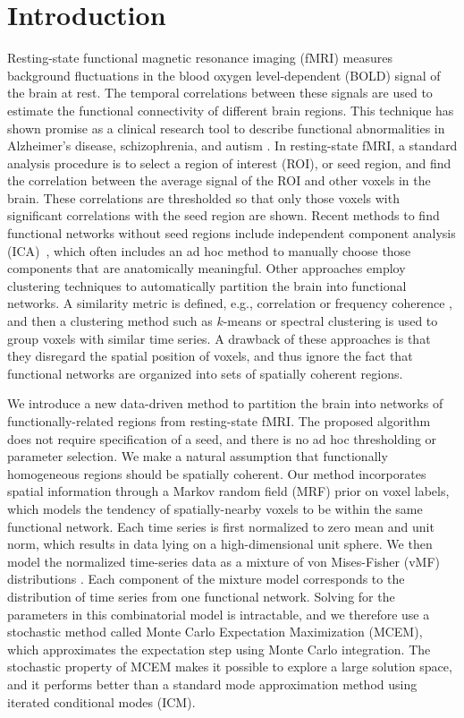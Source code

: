 \documentclass[runningheads, a4paper]{llncs}
\begin{document}
\section{Introduction}
Resting-state functional magnetic resonance imaging (fMRI) measures background
fluctuations in the blood oxygen level-dependent (BOLD) signal of the brain at
rest. The temporal correlations between these signals are used to estimate the
functional connectivity of different brain regions. This technique has shown
promise as a clinical research tool to describe functional abnormalities in
Alzheimer's disease, schizophrenia, and autism \cite{fox2010clinical}. In
resting-state fMRI, a standard analysis procedure is to select a region of
interest (ROI), or seed region, and find the correlation between the average
signal of the ROI and other voxels in the brain. These correlations are
thresholded so that only those voxels with significant correlations with the
seed region are shown. Recent methods to find functional networks without seed
regions include independent component analysis
(ICA)~\cite{beckmann2005tensorial}, which often includes an ad hoc method to
manually choose those components that are anatomically meaningful. Other
approaches employ clustering techniques to automatically partition the brain
into functional networks. A similarity metric is defined, e.g., correlation
\cite{5074650} or frequency coherence \cite{thirion2006detection}, and then a
clustering method such as $k$-means or spectral clustering is used to group
voxels with similar time series. A drawback of these approaches is that they
disregard the spatial position of voxels, and thus ignore the fact that
functional networks are organized into sets of spatially coherent regions.

We introduce a new data-driven method to partition the brain into networks of
functionally-related regions from resting-state fMRI. The proposed algorithm
does not require specification of a seed, and there is no ad hoc thresholding or
parameter selection. We make a natural assumption that functionally homogeneous
regions should be spatially coherent. Our method incorporates spatial
information through a Markov random field (MRF) prior on voxel labels, which
models the tendency of spatially-nearby voxels to be within the same functional
network. Each time series is first normalized to zero mean and unit norm, which
results in data lying on a high-dimensional unit sphere. We then model the
normalized time-series data as a mixture of von Mises-Fisher (vMF) distributions
\cite{banerjee2006clustering}. Each component of the mixture model corresponds
to the distribution of time series from one functional network. Solving for the
parameters in this combinatorial model is intractable, and we therefore use a
stochastic method called Monte Carlo Expectation Maximization (MCEM), which
approximates the expectation step using Monte Carlo integration. The stochastic
property of MCEM makes it possible to explore a large solution space, and it
performs better than a standard mode approximation method using iterated
conditional modes (ICM).
\end{document}
